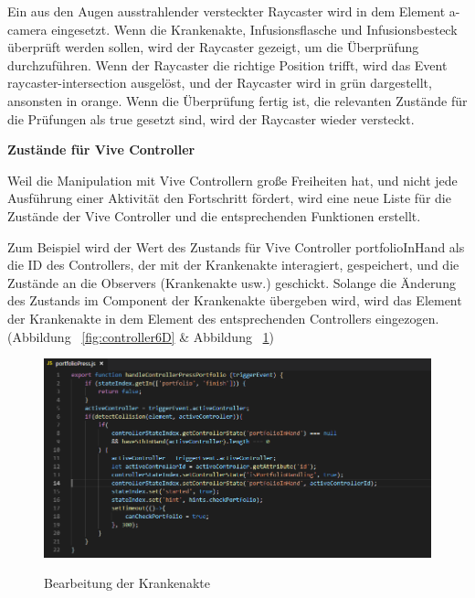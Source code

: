   Ein aus den Augen ausstrahlender versteckter Raycaster wird in dem Element {\selectfont a-camera} eingesetzt. Wenn die Krankenakte, Infusionsflasche und Infusionsbesteck überprüft werden sollen, wird der Raycaster gezeigt, um die Überprüfung durchzuführen. Wenn der Raycaster die richtige Position trifft, wird das Event {\selectfont raycaster-intersection} ausgelöst, und der Raycaster wird in grün dargestellt, ansonsten in orange. Wenn die Überprüfung fertig ist, die relevanten Zustände für die Prüfungen als {\selectfont true} gesetzt sind, wird der Raycaster wieder versteckt.
  
  \textbf{Zustände für Vive Controller}
  
  Weil die Manipulation mit Vive Controllern große Freiheiten hat, und nicht jede Ausführung einer Aktivität den Fortschritt fördert, wird eine neue Liste für die Zustände der Vive Controller und die entsprechenden Funktionen erstellt.
  
  Zum Beispiel wird der Wert des Zustands für Vive Controller {\selectfont portfolioInHand} als die ID des Controllers, der mit der Krankenakte interagiert, gespeichert, und die Zustände an die Observers (Krankenakte usw.) geschickt. Solange die Änderung des Zustands im Component der Krankenakte übergeben wird, wird das Element der Krankenakte in dem Element des entsprechenden Controllers eingezogen. (Abbildung ~\ref{fig:controller6D} \& Abbildung ~\ref{fig:portfolioPress})
  
\begin{figure}[ht]
\vspace*{1em}
\centering
\caption[Bearbeitung der Krankenakte]{Bearbeitung der Krankenakte}
\includegraphics[width=\textwidth]{images/portfolioPress.png}
\label{fig:portfolioPress} 
\end{figure}
  
